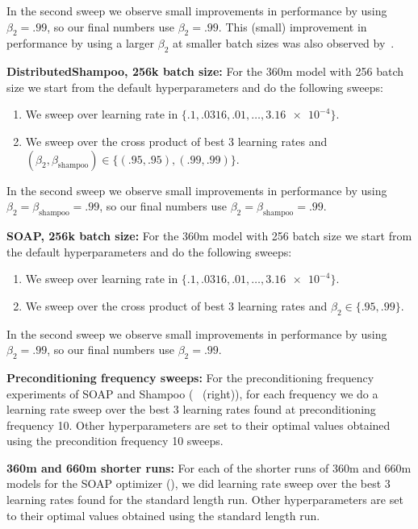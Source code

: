 \documentclass{article} %
\begin{document}
In the second sweep we observe small improvements in performance by using $\beta_2 = .99$, so our final numbers use $\beta_2 = .99$. This (small) improvement in performance by using a larger $\beta_2$ at smaller batch sizes was also observed by~\citet{porian,zhaoscience}.

\textbf{DistributedShampoo, 256k batch size:}
For the 360m model with 256 batch size we start from the default hyperparameters and do the following sweeps:
\begin{enumerate}
    \item We sweep over learning rate in $\{.1, .0316, .01,\ldots, \num{3.16e-4}\}$.
    \item We sweep over the cross product of best 3 learning rates and $(\beta_2, \beta_{\text{shampoo}}) \in \{(.95, .95), (.99, .99)\}$.
\end{enumerate}

In the second sweep we observe small improvements in performance by using $\beta_2 = \beta_{\text{shampoo}} = .99$, so our final numbers use $\beta_2 = \beta_{\text{shampoo}} = .99$. 

\textbf{SOAP, 256k batch size:}
For the 360m model with 256 batch size we start from the default hyperparameters and do the following sweeps:
\begin{enumerate}
    \item We sweep over learning rate in $\{.1, .0316, .01,\ldots, \num{3.16e-4}\}$.
    \item We sweep over the cross product of best 3 learning rates and $\beta_2 \in \{.95, .99\}$.
\end{enumerate}

In the second sweep we observe small improvements in performance by using $\beta_2 = .99$, so our final numbers use $\beta_2 = .99$. 

\textbf{Preconditioning frequency sweeps:} For the preconditioning frequency experiments of SOAP and Shampoo (~ (right)), for each frequency we do a learning rate sweep over the best 3 learning rates found at preconditioning frequency 10. Other hyperparameters are set to their optimal values obtained using the precondition frequency 10 sweeps.

\textbf{360m and 660m shorter runs:} For each of the shorter runs of 360m and 660m models for the SOAP optimizer (), we did learning rate sweep over the best 3 learning rates found for the standard length run. Other hyperparameters are set to their optimal values obtained using the standard length run.
\end{document}
